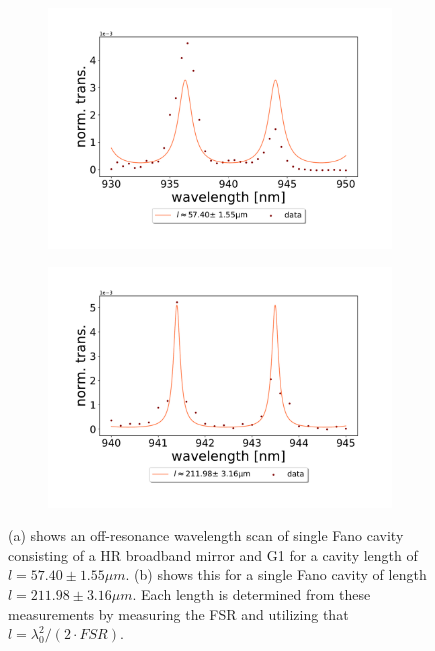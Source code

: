 \begin{figure}[h!]
    \centering
    \begin{subfigure}[b]{0.49\textwidth}
        \centering
        \includegraphics[width=\textwidth]{figures/results/single fano fits/60um_off_res_fabry_perot.pdf}
        \caption{}
        \label{fig:short_single_fano_FSR}
    \end{subfigure}
    \begin{subfigure}[b]{0.49\textwidth}
        \centering
        \includegraphics[width=\textwidth]{figures/results/single fano fits/220um_off_res_fabry_perot.pdf}
        \caption{}
        \label{fig:long_single_fano_FSR}
    \end{subfigure}
    \caption{(a) shows an off-resonance wavelength scan of single Fano cavity consisting of a HR broadband mirror and G1 for a cavity length of $l = 57.40 \pm 1.55 \mu m$. (b) shows this for a single Fano cavity of length $l = 211.98 \pm 3.16 \mu m$. Each length is determined from these measurements by measuring the FSR and utilizing that $l = \lambda_0^2/(2\cdot FSR)$.}
    \label{fig:single_fano_fsr_scans}
\end{figure}


